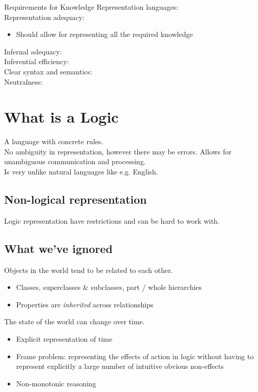 Requirements for Knowledge Representation languages:\\
Representation adequacy:\\
\begin{itemize}
\item Should allow for representing all the required knowledge
\end{itemize}
Infernal adequacy:\\

Inferential efficiency:\\

Clear syntax and semantics:\\

Neutralness:\\

\section{What is a Logic}
A language with concrete rules.\\
No ambiguity in representation, however there may be errors. Allows for unambiguous communication and processing. \\
Is very unlike natural languages like e.g. English.\\

\subsection{Non-logical representation}
Logic representation have restrictions and can be hard to work with.

\subsection{What we've ignored}
Objects in the world tend to be related to each other.
\begin{itemize}
\item Classes, superclasses \& subclasses, part / whole hierarchies
\item Properties are \textit{inherited} across relationships
\end{itemize}

The state of the world can change over time.
\begin{itemize}
\item Explicit representation of time
\item Frame problem: representing the effects of action in logic without having to represent explicitly a large number of intuitive obvious non-effects
\item Non-monotonic reasoning
\end{itemize}

